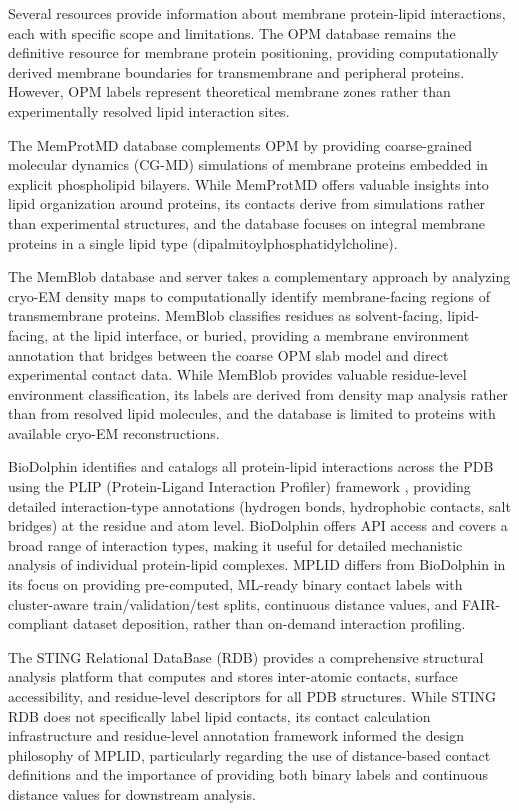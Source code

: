 \documentclass[unnumsec,webpdf,contemporary,large]{oup-authoring-template}
\begin{document}
Several resources provide information about membrane protein-lipid interactions, each with specific scope and limitations. The OPM database \cite{lomize2012} remains the definitive resource for membrane protein positioning, providing computationally derived membrane boundaries for transmembrane and peripheral proteins. However, OPM labels represent theoretical membrane zones rather than experimentally resolved lipid interaction sites.

The MemProtMD database \cite{newport2019, stansfeld2015} complements OPM by providing coarse-grained molecular dynamics (CG-MD) simulations of membrane proteins embedded in explicit phospholipid bilayers. While MemProtMD offers valuable insights into lipid organization around proteins, its contacts derive from simulations rather than experimental structures, and the database focuses on integral membrane proteins in a single lipid type (dipalmitoylphosphatidylcholine).

The MemBlob database and server \cite{memblob2019} takes a complementary approach by analyzing cryo-EM density maps to computationally identify membrane-facing regions of transmembrane proteins. MemBlob classifies residues as solvent-facing, lipid-facing, at the lipid interface, or buried, providing a membrane environment annotation that bridges between the coarse OPM slab model and direct experimental contact data. While MemBlob provides valuable residue-level environment classification, its labels are derived from density map analysis rather than from resolved lipid molecules, and the database is limited to proteins with available cryo-EM reconstructions.

BioDolphin \cite{biodolphin2024} identifies and catalogs all protein-lipid interactions across the PDB using the PLIP (Protein-Ligand Interaction Profiler) framework \cite{plip2021}, providing detailed interaction-type annotations (hydrogen bonds, hydrophobic contacts, salt bridges) at the residue and atom level. BioDolphin offers API access and covers a broad range of interaction types, making it useful for detailed mechanistic analysis of individual protein-lipid complexes. MPLID differs from BioDolphin in its focus on providing pre-computed, ML-ready binary contact labels with cluster-aware train/validation/test splits, continuous distance values, and FAIR-compliant dataset deposition, rather than on-demand interaction profiling.

The STING Relational DataBase (RDB) \cite{neshich2003, neshich2006} provides a comprehensive structural analysis platform that computes and stores inter-atomic contacts, surface accessibility, and residue-level descriptors for all PDB structures. While STING RDB does not specifically label lipid contacts, its contact calculation infrastructure and residue-level annotation framework informed the design philosophy of MPLID, particularly regarding the use of distance-based contact definitions and the importance of providing both binary labels and continuous distance values for downstream analysis.
\end{document}
